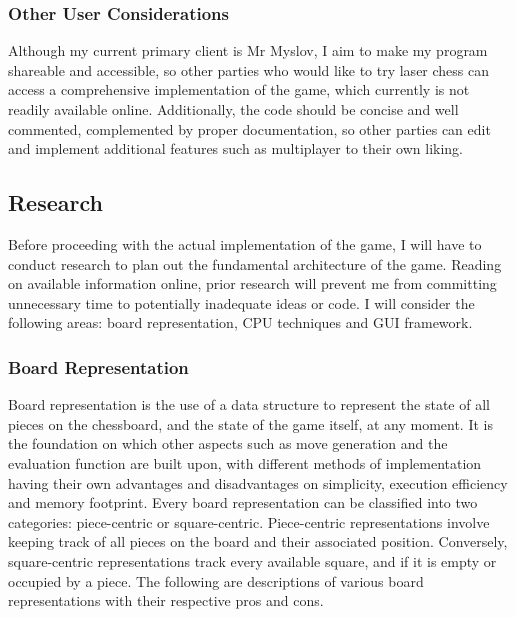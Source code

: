 \documentclass[../main/main.tex]{subfiles}
\begin{document}
\subsubsection{Other User Considerations}
Although my current primary client is Mr Myslov, I aim to make my program shareable and accessible, so other parties who would like to try laser chess can access a comprehensive implementation of the game, which currently is not readily available online. Additionally, the code should be concise and well commented, complemented by proper documentation, so other parties can edit and implement additional features such as multiplayer to their own liking.

\subsection{Research}
Before proceeding with the actual implementation of the game, I will have to conduct research to plan out the fundamental architecture of the game. Reading on available information online, prior research will prevent me from committing unnecessary time to potentially inadequate ideas or code. I will consider the following areas: board representation, CPU techniques and GUI framework.

\subsubsection{Board Representation}
Board representation is the use of a data structure to represent the state of all pieces on the chessboard, and the state of the game itself, at any moment. It is the foundation on which other aspects such as move generation and the evaluation function are built upon, with different methods of implementation having their own advantages and disadvantages on simplicity, execution efficiency and memory footprint. Every board representation can be classified into two categories: piece-centric or square-centric. Piece-centric representations involve keeping track of all pieces on the board and their associated position. Conversely, square-centric representations track every available square, and if it is empty or occupied by a piece. The following are descriptions of various board representations with their respective pros and cons.
\end{document}
